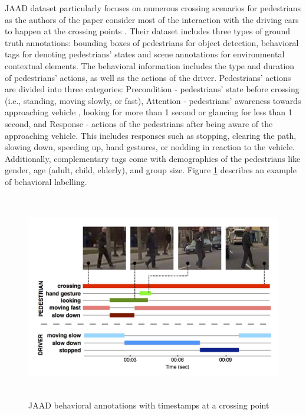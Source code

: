 \tab JAAD dataset particularly focuses on numerous crossing scenarios for pedestrians as the authors of the paper consider most of the interaction with the driving cars to happen at the crossing points \cite{rasouli2017ICCVW}. Their dataset includes three types of ground truth annotations: bounding boxes of pedestrians for object detection, behavioral tags for denoting pedestrians' states and scene annotations for environmental contextual elements. The behavioral information includes the type and duration of pedestrians' actions, as well as the actions of the driver. Pedestrians' actions are divided into three categories: Precondition - pedestrians' state before crossing (i.e., standing, moving slowly, or fast), Attention - pedestrians' awareness towards approaching vehicle , looking for more than 1 second or glancing for less than 1 second, and Response - actions of the pedestrians after being aware of the approaching vehicle. This includes responses such as stopping, clearing the path, slowing down, speeding up, hand gestures, or nodding in reaction to the vehicle. Additionally, complementary tags come with demographics of the pedestrians like gender, age (adult, child, elderly), and group size.
Figure \ref{fig:jaad2} describes an example of behavioral labelling. 


\begin{figure}[h]
  \begin{center}
     \includegraphics[height=90mm]{Images/Figures/jaad_fig2.png}
  \end{center}
  \caption{JAAD behavioral annotations with timestamps at a crossing point}
  \label{fig:jaad2}
\end{figure}

